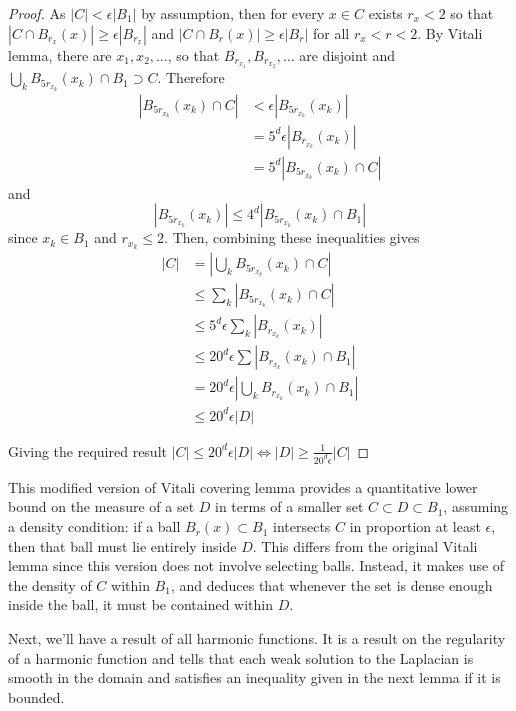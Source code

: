\documentclass[12pt]{artikel1}
\begin{document}
\begin{proof}
    As $|C|<\epsilon|B_1|$ by assumption, then for every $x\in C$ exists $r_x<2$ so that $|C\cap B_{r_x}(x)|\geq\epsilon|B_{r_x}|$ and $|C\cap B_r(x)|\geq\epsilon|B_{r}|$ for all $r_x<r<2$. By Vitali lemma, there are $x_1,x_2,\ldots$, so that $B_{r_{x_1}},B_{r_{x_2}},\ldots$ are disjoint and $\bigcup_kB_{5r_{x_k}}(x_k)\cap B_1\supset C$. Therefore
    \begin{align*}
        |B_{5r_{x_k}}(x_k)\cap C|&<\epsilon|B_{5r_{x_k}}(x_k)| \\
        &=5^d\epsilon|B_{r_{x_k}}(x_k)| \\
        &=5^d|B_{5r_{x_k}}(x_k)\cap C|
    \end{align*}
    and
    \begin{equation*}
        |B_{5r_{x_k}}(x_k)|\leq 4^d|B_{5r_{x_k}}(x_k)\cap B_1|
    \end{equation*}
    since $x_k\in B_1$ and $r_{x_k}\leq2$. Then, combining these inequalities gives
    \begin{align*}
        |C|&=\left|\bigcup_kB_{5r_{x_k}}(x_k)\cap C \right| \\
        &\leq \sum_k|B_{5r_{x_k}}(x_k)\cap C| \\
        &\leq 5^d\epsilon\sum_k|B_{r_{x_k}}(x_k)| \\
        &\leq20^d\epsilon\sum|B_{r_{x_k}}(x_k)\cap B_1| \\
        &=20^d\epsilon\left|\bigcup_kB_{r_{x_k}}(x_k)\cap B_1\right| \\
        &\leq20^d\epsilon|D|
    \end{align*}

    Giving the required result $|C|\leq20^d\epsilon|D|\Leftrightarrow|D|\geq\frac{1}{20^d\epsilon}|C|$
\end{proof}

This modified version of Vitali covering lemma provides a quantitative lower bound on the measure of a set $D$ in terms of a smaller set $C \subset D \subset B_1$, assuming a density condition: if a ball $B_r(x) \subset B_1$ intersects $C$ in proportion at least $\epsilon$, then that ball must lie entirely inside $D$. This differs from the original Vitali lemma since this version does not involve selecting balls. Instead, it makes use of the density of $C$ within $B_1$, and deduces that whenever the set is dense enough inside the ball, it must be contained within $D$.

Next, we'll have a result of all harmonic functions. It is a result on the regularity of a harmonic function and tells that each weak solution to the Laplacian is smooth in the domain and satisfies an inequality given in the next lemma if it is bounded.
\end{document}
